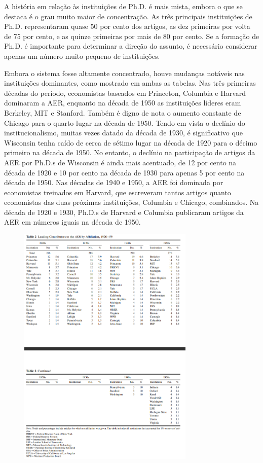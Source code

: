 \documentclass[12pt]{article}
\begin{document}
A história em relação às instituições de Ph.D. é mais mista, embora o que se destaca é o grau muito maior de concentração. As três principais instituições de Ph.D. representaram quase 50 por cento dos artigos, as dez primeiras por volta de 75 por cento, e as quinze primeiras por mais de 80 por cento. Se a formação de Ph.D. é importante para determinar a direção do assunto, é necessário considerar apenas um número muito pequeno de instituições.

Embora o sistema fosse altamente concentrado, houve mudanças notáveis nas instituições dominantes, como mostrado em ambas as tabelas. Nas três primeiras décadas do período, economistas baseados em Princeton, Columbia e Harvard dominaram a AER, enquanto na década de 1950 as instituições líderes eram Berkeley, MIT e Stanford. Também é digno de nota o aumento constante de Chicago para o quarto lugar na década de 1950. Tendo em vista o declínio do institucionalismo, muitas vezes datado da década de 1930, é significativo que Wisconsin tenha caído de cerca de sétimo lugar na década de 1920 para o décimo primeiro na década de 1950. No entanto, o declínio na participação de artigos da AER por Ph.D.s de Wisconsin é ainda mais acentuado, de 12 por cento na década de 1920 e 10 por cento na década de 1930 para apenas 5 por cento na década de 1950. Nas décadas de 1940 e 1950, a AER foi dominada por economistas treinados em Harvard, que escreveram tantos artigos quanto economistas das duas próximas instituições, Columbia e Chicago, combinados. Na década de 1920 e 1930, Ph.D.s de Harvard e Columbia publicaram artigos da AER em números iguais na década de 1950.

\begin{figure}[H]
    \centering
    \includegraphics[width=0.75\textwidth]{4º Período/História do Pensamento Econômico/Tradução HPE/Tradução Tópico 7.2/table 2.png}
    \end{figure}
\end{document}
